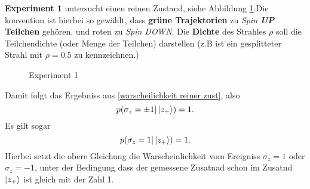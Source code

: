 \documentclass{article}
\begin{document}
\textbf{Experiment 1} untersucht einen reinen Zustand, siehe Abbildung \ref{Exp1}.\color{gray}Die konvention ist hierbei so gewählt, dass \textbf{grüne Trajektorien} zu \textit{Spin \textbf{UP}} \textbf{Teilchen} gehören, und roten zu \textit{Spin DOWN}. Die \textbf{Dichte} des Strahles $\rho$ soll die Teilchendichte (oder Menge der Teilchen) darstellen (z.B ist ein gesplitteter Strahl mit $\rho = 0.5$ zu kennzeichnen.) \color{black}
\begin{figure}[H]
\centering
{}
\caption{Experiment 1}
\label{Exp1}
\end{figure}

Damit folgt das Ergebniss aus \eqref{warscheilichkeit reiner zust}, also 
\begin{equation}
 p(\sigma_z = \pm 1| \ket{z_+}) = 1.
\end{equation}
\color{gray}
Es gilt sogar 
\begin{equation}
 p(\sigma_z = 1| \ket{z_+}) = 1.
\end{equation}
Hierbei setzt die obere Gleichung die Warscheinlichkeit vom Ereigniss $\sigma_z = 1$ oder $\sigma_z = -1$, unter der Bedingung dass der gemessene Zusatnad schon im Zusatnd $\ket{z_+}$ ist gleich mit der Zahl 1.
\color{black}
\end{document}
